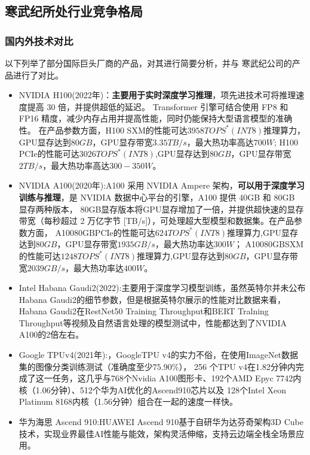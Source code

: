 \subsection{寒武纪所处行业竞争格局}

\subsubsection{国内外技术对比}
以下列举了部分国际巨头厂商的产品，对其进行简要分析，并与
寒武纪公司的产品进行了对比。

\begin{itemize}
    \item NVIDIA H100(2022年)：\textbf{主要用于实时深度学习推理}，项先进技术可将推理速度提高 30 倍，并提供超低的延迟。
    Transformer 引擎可结合使用 FP8 和 FP16 精度，减少内存占用并提高性能，同时仍能保持大型语言模型的准确性。
    在产品参数方面，H100 SXM的性能可达$3958TOPS^*(INT8)$推理算力，GPU显存达到$80GB$，GPU显存带宽$3.35TB/s$，最大热功率高达$700W$;
    H100 PCIe的性能可达$3026TOPS^*(INT8)$,GPU显存达到$80GB$，GPU显存带宽$2TB/s$，最大热功率高达$300-350W$。
    \item NVIDIA A100(2020年):A100 采用 NVIDIA Ampere 架构，\textbf{可以用于深度学习训练与推理}，是 NVIDIA 数据中心平台的引擎，A100 提供 40GB 和 80GB 显存两种版本，
    80GB显存版本将GPU显存增加了一倍，并提供超快速的显存带宽（每秒超过 2 万亿字节 [TB/s]），可处理超大型模型和数据集。在产品参数方面，
    A100\quad 80GB\quad PCIe的性能可达$624TOPS^*(INT8)$推理算力,GPU显存达到$80GB$，GPU显存带宽$1935GB/s$，最大热功率达$300W$；
    A100\quad 80GB\quad SXM的性能可达$1248TOPS^*(INT8)$推理算力,GPU显存达到$80GB$，GPU显存带宽$2039GB/s$，最大热功率达$400W$。
    \item Intel Habana Gaudi2(2022):主要用于深度学习模型训练，虽然英特尔并未公布Habana Gaudi2的细节参数，但是根据英特尔展示的性能对比数据来看，
    Habana Gaudi2在RestNet50 Training Throughput和BERT Tralning Throughput等视频及自然语言处理的模型测试中，性能都达到了NVIDIA A100的2倍左右。
    \item Google TPUv4(2021年):，GoogleTPU v4的实力不俗，在使用ImageNet数据集的图像分类训练测试（准确度至少$75.90\%$），
    256 个TPU v4在1.82分钟内完成了这一任务，这几乎与768个Nvidia A100图形卡、192个AMD Epyc 7742内核（1.06分钟）、512个华为AI优化的Ascend910芯片以及
    128个Intel Xeon Platinum 8168内核（1.56分钟）组合在一起的速度一样快。
    \item 华为海思 Ascend 910:HUAWEI Ascend 910基于自研华为达芬奇架构3D Cube技术，实现业界最佳AI性能与能效，架构灵活伸缩，支持云边端全栈全场景应用。

\end{itemize}
